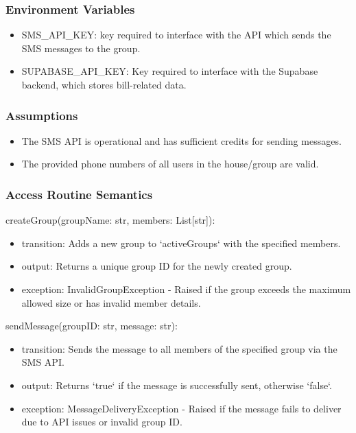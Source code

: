 \documentclass[12pt, titlepage]{article}
\begin{document}
\subsubsection{Environment Variables}

\begin{itemize}
\item SMS{\_}API{\_}KEY: key required to interface with the API which sends the SMS messages to the group.
\item SUPABASE{\_}API{\_}KEY: Key required to interface with the Supabase backend, which stores bill-related data.
\end{itemize}
  
\subsubsection{Assumptions}

\begin{itemize}
  \item The SMS API is operational and has sufficient credits for sending messages.
  \item The provided phone numbers of all users in the house/group are valid.
\end{itemize}

\subsubsection{Access Routine Semantics}

\noindent createGroup(groupName: str, members: List[str]):
\begin{itemize}
\item transition: Adds a new group to `activeGroups` with the specified members.
\item output: Returns a unique group ID for the newly created group.
\item exception: InvalidGroupException - Raised if the group exceeds the maximum allowed size or has invalid member details.
\end{itemize}

\noindent sendMessage(groupID: str, message: str):
\begin{itemize}
\item transition: Sends the message to all members of the specified group via the SMS API.
\item output: Returns `true` if the message is successfully sent, otherwise `false`.
\item exception: MessageDeliveryException - Raised if the message fails to deliver due to API issues or invalid group ID.
\end{itemize}
\end{document}
